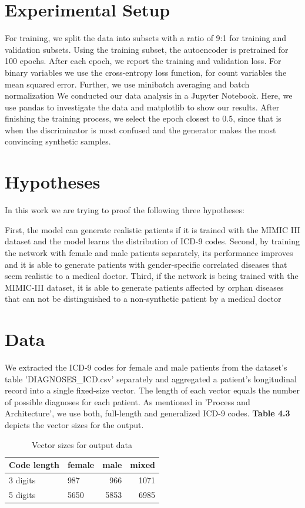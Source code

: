 \documentclass[11pt, a4paper]{book}
\begin{document}
\section{Experimental Setup}
 For training, we split the data into subsets with a ratio of 9:1 for training and validation subsets. Using the training subset, the autoencoder is pretrained for 100 epochs. 
 After each epoch, we report the training and validation loss. For binary variables we use the cross-entropy loss  function, for count variables the mean squared error.
 Further, we use minibatch averaging and batch normalization
We conducted our data analysis in a Jupyter Notebook. Here, we use pandas to investigate the data and matplotlib to show our results.
After finishing the training process, we select the epoch closest to 0.5, since that is when the discriminator is most confused and the generator makes the most convincing synthetic samples.


\section{Hypotheses}
In this work we are trying to proof the following three hypotheses:

First, the model can generate realistic patients if it is trained with the MIMIC III dataset and the model learns the distribution of ICD-9 codes.
Second, by training the network with female and male patients separately, its performance improves and it is able to generate patients with gender-specific correlated diseases that seem realistic to a medical doctor.
Third, if the network is being trained with the MIMIC-III dataset, it is able to generate patients affected by orphan diseases that can not be distinguished to a non-synthetic patient by a medical doctor



\section{Data}
We extracted the ICD-9 codes for female and male patients from the dataset's table 'DIAGNOSES\_ICD.csv' separately and aggregated a patient’s longitudinal record into a single fixed-size vector. The length of each vector equals the number of possible diagnoses for each patient. As mentioned in 'Process and Architecture', we use both, full-length and generalized ICD-9 codes. \textbf{Table 4.3} depicts the vector sizes for the output.


\begin{table}
\begin{tabularx}{\textwidth}{X|l|r|r}
Code length & female & male & mixed\\
\hline
3 digits  & 987 & 966 & 1071\\
5 digits & 5650 & 5853 & 6985\\
\end{tabularx}
\caption{Vector sizes for output data}
\end{table}
\end{document}

